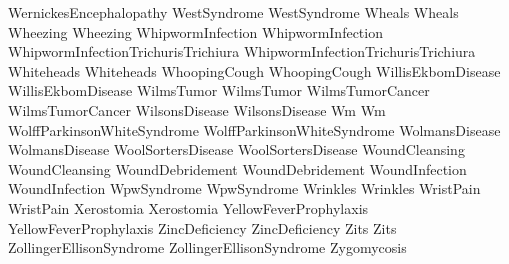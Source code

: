  WernickesEncephalopathy
 WestSyndrome
 WestSyndrome
 Wheals
 Wheals
 Wheezing
 Wheezing
 WhipwormInfection
 WhipwormInfection
 WhipwormInfectionTrichurisTrichiura
 WhipwormInfectionTrichurisTrichiura
 Whiteheads
 Whiteheads
 WhoopingCough
 WhoopingCough
 WillisEkbomDisease
 WillisEkbomDisease
 WilmsTumor
 WilmsTumor
 WilmsTumorCancer
 WilmsTumorCancer
 WilsonsDisease
 WilsonsDisease
 Wm
 Wm
 WolffParkinsonWhiteSyndrome
 WolffParkinsonWhiteSyndrome
 WolmansDisease
 WolmansDisease
 WoolSortersDisease
 WoolSortersDisease
 WoundCleansing
 WoundCleansing
 WoundDebridement
 WoundDebridement
 WoundInfection
 WoundInfection
 WpwSyndrome
 WpwSyndrome
 Wrinkles
 Wrinkles
 WristPain
 WristPain
 Xerostomia
 Xerostomia
 YellowFeverProphylaxis
 YellowFeverProphylaxis
 ZincDeficiency
 ZincDeficiency
 Zits
 Zits
 ZollingerEllisonSyndrome
 ZollingerEllisonSyndrome
 Zygomycosis

